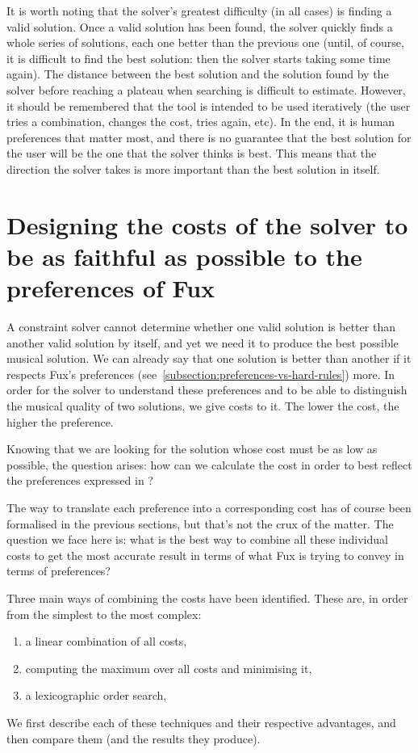 It is worth noting that the solver's greatest difficulty (in all cases) is finding a valid solution. Once a valid solution has been found, the solver quickly finds a whole series of solutions, each one better than the previous one (until, of course, it is difficult to find the best solution: then the solver starts taking some time again). The distance between the best solution and the solution found by the solver before reaching a plateau when searching is difficult to estimate. However, it should be remembered that the tool is intended to be used iteratively (the user tries a combination, changes the cost, tries again, etc). In the end, it is human preferences that matter most, and there is no guarantee that the best solution for the user will be the one that the solver thinks is best. This means that the direction the solver takes is more important than the best solution in itself.

\section{Designing the costs of the solver to be as faithful as possible to the preferences of Fux} \label{costs}
A constraint solver cannot determine whether one valid solution is better than another valid solution by itself, and yet we need it to produce the best possible musical solution. We can already say that one solution is better than another if it respects Fux's preferences (see~\ref{subsection:preferences-vs-hard-rules}) more. In order for the solver to understand these preferences and to be able to distinguish the musical quality of two solutions, we give costs to it.  The lower the cost, the higher the preference.

Knowing that we are looking for the solution whose cost must be as low as possible, the question arises: how can we calculate the cost in order to best reflect the preferences expressed in \gap?

The way to translate each preference into a corresponding cost has of course been formalised in the previous sections, but that's not the crux of the matter. The question we face here is: what is the best way to combine all these individual costs to get the most accurate result in terms of what Fux is trying to convey in terms of preferences?

Three main ways of combining the costs have been identified. These are, in order from the simplest to the most complex:
\begin{enumerate}
    \item a linear combination of all costs,
    \item computing the maximum over all costs and minimising it,
    \item a lexicographic order search, 
\end{enumerate}
We first describe each of these techniques and their respective advantages, and then compare them (and the results they produce).

